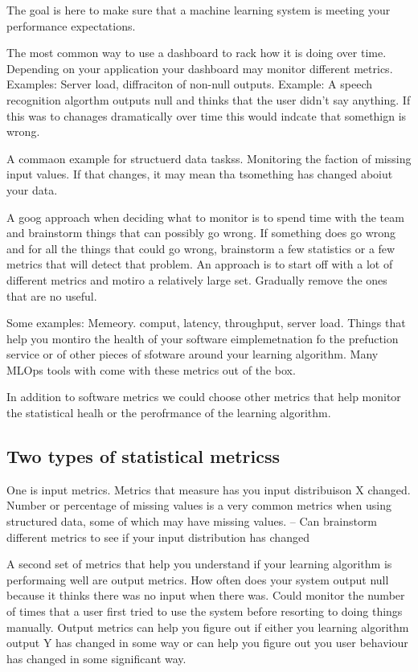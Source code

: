 The goal is here to make sure that a machine learning system is meeting your performance expectations.

The most common way to use a dashboard to rack how it is doing over time. Depending on your application your dashboard may monitor different metrics.
Examples: Server load, diffraciton of non-null outputs. Example:  A speech recognition algorthm outputs null and thinks that the user didn't say anything.
If this was to chanages dramatically over time this would indcate that somethign is wrong.

A commaon example for structuerd data taskss. Monitoring the faction of missing input values. If that changes, it may mean tha tsomething has changed aboiut your data.

A goog approach when deciding what to monitor is to spend time with the team and brainstorm things that can possibly go wrong. If something does go wrong and for all the things that could go wrong, brainstorm a few statistics or a few metrics that will detect that problem.
An approach is to start off with a lot of different metrics and motiro a relatively large set.
Gradually remove the ones that are no useful.

Some examples: Memeory. comput, latency, throughput, server load.
Things that help you montiro the health of your software eimplemetnation fo the prefuction service or of other pieces of sfotware around your learning algorithm.
Many MLOps tools with come with these metrics out of the box.

In addition to software metrics we could choose other metrics that help monitor the statistical healh or the perofrmance of the learning algorithm.

\subsection{Two types of statistical metricss}

One is input metrics. Metrics that measure has you input distribuison X changed.
Number or percentage of missing values is a very common metrics when using structured data, some of which may have missing values.
-- Can brainstorm different metrics to see if your input distribution has changed



A second set of metrics that help you understand if your learning algorithm is performaing well are output metrics.
How often does your system output null because it thinks there was no input when there was.
Could monitor the number of times that a user first tried to use the system before resorting to doing things manually.
Output metrics can help you figure out if either you learning algorithm output Y has changed in some way or can help you figure out you user behaviour has changed in some significant way.

